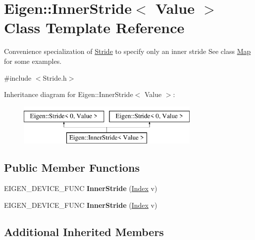 \hypertarget{class_eigen_1_1_inner_stride}{}\section{Eigen\+:\+:Inner\+Stride$<$ Value $>$ Class Template Reference}
\label{class_eigen_1_1_inner_stride}


Convenience specialization of \hyperlink{group___core___module_class_eigen_1_1_stride}{Stride} to specify only an inner stride See class \hyperlink{group___core___module_class_eigen_1_1_map}{Map} for some examples.  




{\ttfamily \#include $<$Stride.\+h$>$}

Inheritance diagram for Eigen\+:\+:Inner\+Stride$<$ Value $>$\+:\begin{figure}[H]
\begin{center}
\leavevmode
\includegraphics[height=2.000000cm]{class_eigen_1_1_inner_stride}
\end{center}
\end{figure}
\subsection*{Public Member Functions}
\begin{DoxyCompactItemize}
\item 
\mbox{\label{class_eigen_1_1_inner_stride_a20ca7713cfa33c0b0de61123bc0ea647}} 
E\+I\+G\+E\+N\+\_\+\+D\+E\+V\+I\+C\+E\+\_\+\+F\+U\+NC {\bfseries Inner\+Stride} (\hyperlink{group___core___module_a96c2dfb0ce43fd8e19adcdf6094f5f63}{Index} v)
\item 
\mbox{\label{class_eigen_1_1_inner_stride_a20ca7713cfa33c0b0de61123bc0ea647}} 
E\+I\+G\+E\+N\+\_\+\+D\+E\+V\+I\+C\+E\+\_\+\+F\+U\+NC {\bfseries Inner\+Stride} (\hyperlink{group___core___module_a96c2dfb0ce43fd8e19adcdf6094f5f63}{Index} v)
\end{DoxyCompactItemize}
\subsection*{Additional Inherited Members}



